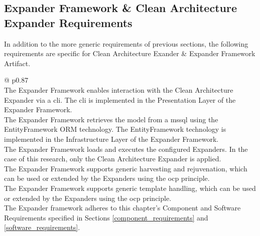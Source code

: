 \subsection{Expander Framework \& Clean Architecture Expander Requirements} \label{expander_framework_requirements}

In addition to the more generic requirements of previous sections, the following
requirements are specific for Clean Architecture Exander \& Expander Framework Artifact.

\begin{table}[H]
    \begin{tabular}{@{\makebox[2em][c]{\rownumber\space}}  p{0.87\linewidth}}
        \\ 
    \hline
    The Expander Framework enables interaction with the Clean Architecture Expander via a
    \gls{cli}. The \gls{cli} is implemented in the Presentation Layer of the
    Expander Framework. \\

    The Expander Framework retrieves the model from a \gls{mssql} using the
    EntityFramework ORM technology. The EntityFramework technology is implemented in the
    Infrastructure Layer of the Expander Framework. \\
    
    The Expander Framework loads and executes the configured Expanders. In the case of
    this research, only the Clean Architecture Expander is applied. \\

    The Expander Framework supports generic harvesting and rejuvenation, which can be
    used or extended by the Expanders using the \gls{ocp} principle. \\

    The Expander Framework supports generic template handling, which can be used or
    extended by the Expanders using the \gls{ocp} principle. \\

    The Expander framework adheres to this chapter's Component and Software Requirements
    specified in Sections \ref{component_requirements} and \ref{software_requirements}. \\

    \hline
    \end{tabular}
\caption{Expander Framework Requirements}
\label{table_requirements_expanderframework}
\end{table}

